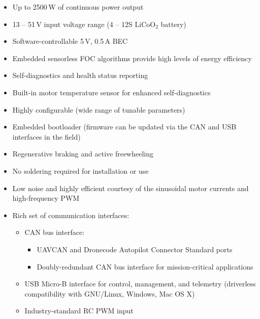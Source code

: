 \documentclass{zubaxdoc}
\begin{document}
\begin{titlepage}
\begin{itemize}[leftmargin=!,labelindent=!,itemindent=0pt]
    \item Up to 2500\,W of continuous power output
    \item 13 -- 51\,V input voltage range (4 -- 12S $\text{LiCoO}_\text{2}$ battery)
    \item Software-controllable 5\,V, 0.5\,A BEC
    \item Embedded sensorless FOC algorithms provide high levels of energy efficiency
    \item Self-diagnostics and health status reporting
    \item Built-in motor temperature sensor for enhanced self-diagnostics
    \item Highly configurable (wide range of tunable parameters)
    \item Embedded bootloader (firmware can be updated via the CAN and USB interfaces in the field)
    \item Regenerative braking and active freewheeling
    \item No soldering required for installation or use
    \item Low noise and highly efficient courtesy of the sinusoidal motor currents and high-frequency PWM
    \item Rich set of communication interfaces:
     \begin{itemize}[label=--,itemindent=0pt]
        \item CAN bus interface:
        \begin{itemize}[label=*,leftmargin=8pt,itemindent=0pt]
            \item UAVCAN and Dronecode Autopilot Connector Standard ports
            \item Doubly-redundant CAN bus interface for mission-critical applications
        \end{itemize}
        \item USB Micro-B interface for control, management, and telemetry (driverless compatibility
              with GNU/Linux, Windows, Mac OS X)
        \item Industry-standard RC PWM input
    \end{itemize}
\end{itemize}


\end{titlepage}
\end{document}
